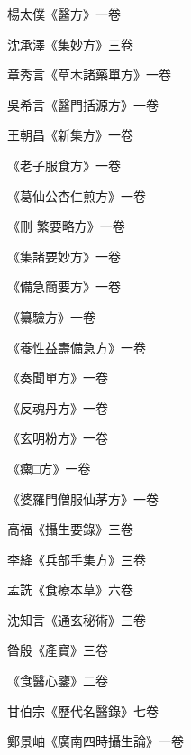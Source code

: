 \begin{pinyinscope}
 楊太僕《醫方》一卷



 沈承澤《集妙方》三卷



 章秀言《草木諸藥單方》一卷



 吳希言《醫門括源方》一卷



 王朝昌《新集方》一卷



 《老子服食方》一卷



 《葛仙公杏仁煎方》一卷



 《刪
 繁要略方》一卷



 《集諸要妙方》一卷



 《備急簡要方》一卷



 《纂驗方》一卷



 《養性益壽備急方》一卷



 《奏聞單方》一卷



 《反魂丹方》一卷



 《玄明粉方》一卷



 《瘰□方》一卷



 《婆羅門僧服仙茅方》一卷



 高福《攝生要錄》三卷



 李絳《兵部手集方》三卷



 孟詵《食療本草》六卷



 沈知言《通玄秘術》三卷



 昝殷《產寶》三卷



 《食醫心鑒》二卷



 甘伯宗《歷代名醫錄》七卷



 鄭景岫《廣南四時攝生論》一卷




\end{pinyinscope}
